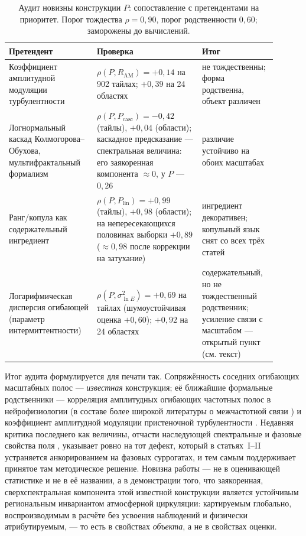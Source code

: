 \documentclass[11pt,a4paper]{article}
\begin{document}
\begin{table}[t]
\centering
\caption{Аудит новизны конструкции $P$: сопоставление с претендентами на приоритет. Порог тождества $\rho=0{,}90$, порог родственности $0{,}60$; заморожены до вычислений.}
\label{tab:audit}
\small
\begin{tabular}{@{}p{0.30\linewidth}p{0.36\linewidth}p{0.24\linewidth}@{}}
\toprule
Претендент & Проверка & Итог\\
\midrule
Коэффициент амплитудной модуляции турбулентности \cite{Mathis2009} & $\rho(P,R_{\mathrm{AM}})=+0{,}14$ на 902 тайлах; $+0{,}39$ на 24 областях & не тождественны; форма родственна, объект различен\\
Логнормальный каскад Колмогорова--Обухова, мультифрактальный формализм \cite{LovejoySchertzer2013} & $\rho(P,P_{\mathrm{casc}})=-0{,}42$ (тайлы), $+0{,}04$ (области); каскадное предсказание --- спектральная величина: его заякоренная компонента $\approx0$, у $P$ --- $0{,}26$ & различие устойчиво на обоих масштабах\\
Ранг/копула как содержательный ингредиент & $\rho(P,P_{\mathrm{lin}})=+0{,}99$ (тайлы), $+0{,}98$ (области); на непересекающихся половинах выборки $+0{,}89$ ($\approx0{,}98$ после коррекции на затухание) & ингредиент декоративен; копульный язык снят со всех трёх статей\\
Логарифмическая дисперсия огибающей (параметр интермиттентности) & $\rho(P,\sigma^2_{\ln E})=+0{,}69$ на тайлах (шумоустойчивая оценка $+0{,}60$); $+0{,}92$ на 24 областях & содержательный, но не тождественный родственник; усиление связи с масштабом --- открытый пункт (см. текст)\\
\bottomrule
\end{tabular}
\end{table}

Итог аудита формулируется для печати так. Сопряжённость соседних огибающих масштабных полос --- \emph{известная} конструкция; её ближайшие формальные родственники --- корреляция амплитудных огибающих частотных полос в нейрофизиологии \cite{Bruns2000} (в составе более широкой литературы о межчастотной связи \cite{Canolty2006}) и коэффициент амплитудной модуляции пристеночной турбулентности \cite{Mathis2009}. Недавняя критика последнего как величины, отчасти наследующей спектральные и фазовые свойства поля \cite{CuiJacobi2025}, указывает ровно на тот дефект, который в статьях~I--II устраняется анкорированием на фазовых суррогатах, и тем самым поддерживает принятое там методическое решение. Новизна работы --- не в оценивающей статистике и не в её названии, а в демонстрации того, что заякоренная, сверхспектральная компонента этой известной конструкции является устойчивым региональным инвариантом атмосферной циркуляции: картируемым глобально, воспроизводимым в расчёте без усвоения наблюдений и физически атрибутируемым, --- то есть в свойствах \emph{объекта}, а не в свойствах оценки.
\end{document}

